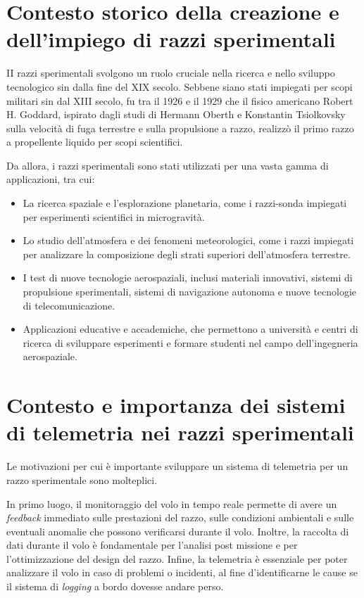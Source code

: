 \documentclass[12pt,a4paper,twoside]{book}
\begin{document}
\section{Contesto storico della creazione e dell'impiego di razzi sperimentali}
II razzi sperimentali svolgono un ruolo cruciale nella ricerca e nello sviluppo
tecnologico sin dalla fine del XIX secolo.
Sebbene siano stati impiegati per scopi militari sin dal XIII secolo, fu tra il
1926 e il 1929 che il fisico americano Robert H. Goddard, ispirato dagli studi
di Hermann Oberth e Konstantin Tsiolkovsky sulla velocità di fuga terrestre e
sulla propulsione a razzo, realizzò il primo razzo a propellente liquido per
scopi scientifici\cite{seibert2006history}.

Da allora, i razzi sperimentali sono stati utilizzati per una vasta gamma di
applicazioni, tra cui:
\begin{itemize}
    \item La ricerca spaziale e l’esplorazione planetaria, come i razzi-sonda
          impiegati per esperimenti scientifici in microgravità.
    \item Lo studio dell’atmosfera e dei fenomeni meteorologici, come i razzi
          impiegati per analizzare la composizione degli strati superiori
          dell’atmosfera terrestre.
    \item I test di nuove tecnologie aerospaziali, inclusi materiali innovativi,
          sistemi di propulsione sperimentali, sistemi di navigazione autonoma e
          nuove tecnologie di telecomunicazione.
    \item Applicazioni educative e accademiche, che permettono a università e
          centri di ricerca di sviluppare esperimenti e formare studenti nel campo
          dell’ingegneria aerospaziale.
\end{itemize}

\section{Contesto e importanza dei sistemi di telemetria nei razzi sperimentali}
Le motivazioni per cui \`e importante sviluppare un sistema di telemetria per un
razzo sperimentale sono molteplici.

In primo luogo, il monitoraggio del volo in tempo reale permette di avere un
\emph{feedback} immediato sulle prestazioni del razzo, sulle condizioni
ambientali e sulle eventuali anomalie che possono verificarsi durante il volo.
Inoltre, la raccolta di dati durante il volo \`e fondamentale per l’analisi
post missione e per l’ottimizzazione del design del razzo.
Infine, la telemetria \`e essenziale per poter analizzare il volo in caso di
problemi o incidenti, al fine d'identificarne le cause se il sistema di
\emph{logging} a bordo dovesse andare perso.
\end{document}
